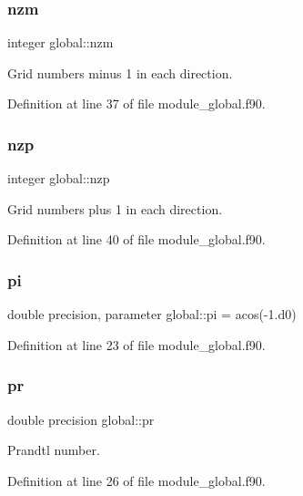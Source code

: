 \subsubsection{\texorpdfstring{nzm}{nzm}}
{\footnotesize\ttfamily integer global\+::nzm}



Grid numbers minus 1 in each direction. 



Definition at line 37 of file module\+\_\+global.\+f90.

\mbox{\label{namespaceglobal_ab376cd7d790b630ad83ffcded3c56366}} 
\subsubsection{\texorpdfstring{nzp}{nzp}}
{\footnotesize\ttfamily integer global\+::nzp}



Grid numbers plus 1 in each direction. 



Definition at line 40 of file module\+\_\+global.\+f90.

\mbox{\label{namespaceglobal_a2eeeef6cb4401e0205ced808c718dead}} 
\subsubsection{\texorpdfstring{pi}{pi}}
{\footnotesize\ttfamily double precision, parameter global\+::pi = acos(-\/1.d0)}



Definition at line 23 of file module\+\_\+global.\+f90.

\mbox{\label{namespaceglobal_a31749f11f262d021576cd0d09bdc79c2}} 
\subsubsection{\texorpdfstring{pr}{pr}}
{\footnotesize\ttfamily double precision global\+::pr}



Prandtl number. 



Definition at line 26 of file module\+\_\+global.\+f90.

